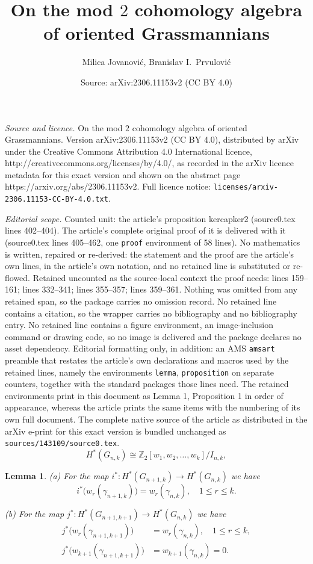 \documentclass[10pt,a4paper]{amsart}
\title{On the mod $2$ cohomology algebra of oriented Grassmannians}
\author{Milica Jovanovi\'c, Branislav I.\ Prvulovi\'c}
\date{Source: arXiv:2306.11153v2 (CC BY 4.0)}
\newtheorem{lemma}{Lemma}
\begin{document}
\maketitle

\noindent\emph{Source and licence.} On the mod $2$ cohomology algebra of oriented Grassmannians. Version arXiv:2306.11153v2 (CC BY 4.0), distributed by arXiv under the Creative Commons Attribution 4.0 International licence, http://creativecommons.org/licenses/by/4.0/, as recorded in the arXiv licence metadata for this exact version and shown on the abstract page https://arxiv.org/abs/2306.11153v2. Full licence notice: \texttt{licenses/arxiv-2306.11153-CC-BY-4.0.txt}.\par\smallskip

\noindent\textit{Editorial scope.} Counted unit: the article's proposition kercapker2 (source0.tex lines 402--404). The article's complete original proof of it is delivered with it (source0.tex lines 405--462, one \texttt{proof} environment of 58 lines). No mathematics is written, repaired or re-derived: the statement and the proof are the article's own lines, in the article's own notation, and no retained line is substituted or re-flowed.  Retained uncounted as the source-local context the proof needs: lines 159--161; lines 332--341; lines 355--357; lines 359--361.  Nothing was omitted from any retained span, so the package carries no omission record.  No retained line contains a citation, so the wrapper carries no bibliography and no bibliography entry.  No retained line contains a figure environment, an image-inclusion command or drawing code, so no image is delivered and the package declares no asset dependency.  Editorial formatting only, in addition: an AMS \texttt{amsart} preamble that restates the article's own declarations and macros used by the retained lines, namely the environments \texttt{lemma}, \texttt{proposition} on separate counters, together with the standard packages those lines need.  The retained environments print in this document as Lemma 1, Proposition 1 in order of appearance, whereas the article prints the same items with the numbering of its own full document.  The complete native source of the article as distributed in the arXiv e-print for this exact version is bundled unchanged as \texttt{sources/143109/source0.tex}.
\begin{equation}\label{kohomologija_grasmanijana}
H^*(G_{n,k})\cong\mathbb Z_2[w_1,w_2,\ldots,w_k]/I_{n,k},
\end{equation}

\begin{lemma}\label{naturality}
{\rm(a)} For the map $i^*:H^*(G_{n+1,k})\rightarrow H^*(G_{n,k})$ we have
 \[i^*\big(w_r(\gamma_{n+1,k})\big)=w_r(\gamma_{n,k}), \quad 1\le r\le k.\]

 {\rm(b)} For the map $j^*:H^*(G_{n+1,k+1})\rightarrow H^*(G_{n,k})$ we have
 \begin{align*}
  j^*\big(w_r(\gamma_{n+1,k+1})\big)&=w_r(\gamma_{n,k}), \quad 1\le r\le k,\\
  j^*\big(w_{k+1}(\gamma_{n+1,k+1})\big)&=w_{k+1}(\gamma_{n,k})=0.   
 \end{align*}
\end{lemma}
\end{document}

